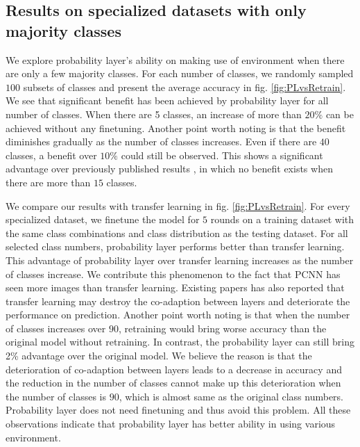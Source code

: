 \documentclass{article}
\begin{document}
\subsection{Results on specialized datasets with only majority classes}

We explore probability layer's ability on making use of environment when there are only a few majority classes. For each number of classes, we randomly sampled $100$ subsets of classes and present the average accuracy in fig. \ref{fig:PLvsRetrain}. We see that significant benefit has been achieved by probability layer for all number of classes. When there are 5 classes, an increase of more than $20\%$ can be achieved without any finetuning. Another point worth noting is that the benefit diminishes gradually as the number of classes increases. Even if there are $40$ classes, a benefit over $10\%$ could still be observed. This shows a significant advantage over previously published results \cite{shen2017fast}, in which no benefit exists when there are more than $15$ classes.
 
We compare our results with transfer learning in fig. \ref{fig:PLvsRetrain}. For every specialized dataset, we finetune the model for $5$ rounds on a training dataset with the same class combinations and class distribution as the testing dataset. For all selected class numbers, probability layer performs better than transfer learning. This advantage of probability layer over transfer learning increases as the number of classes increase. We contribute this phenomenon to the fact that PCNN has seen more images than transfer learning. Existing papers \cite{yosinski2014transferable} has also reported that transfer learning may destroy the co-adaption between layers and deteriorate the performance on prediction. Another point worth noting is that when the number of classes increases over $90$, retraining would bring worse accuracy than the original model without retraining. In contrast, the probability layer can still bring 2\% advantage over the original model. We believe the reason is that the deterioration of co-adaption between layers leads to a decrease in accuracy and the reduction in the number of classes cannot make up this deterioration when the number of classes is $90$, which is almost same as the original class numbers. Probability layer does not need finetuning and thus avoid this problem. All these observations indicate that probability layer has better ability in using various environment.
\end{document}
